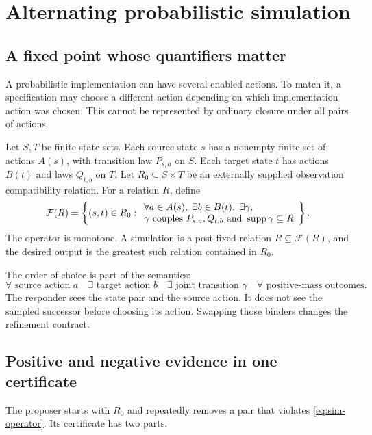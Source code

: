 \section{Alternating probabilistic simulation}
\label{sec:simulation}

\subsection{A fixed point whose quantifiers matter}

A probabilistic implementation can have several enabled actions. To match it,
a specification may choose a different action depending on which
implementation action was chosen. This cannot be represented by ordinary
closure under all pairs of actions.

Let $S,T$ be finite state sets. Each source state $s$ has a nonempty finite
set of actions $A(s)$, with transition law $P_{s,a}$ on $S$. Each target state
$t$ has actions $B(t)$ and laws $Q_{t,b}$ on $T$. Let $R_0\subseteq S\times T$
be an externally supplied observation compatibility relation. For a relation
$R$, define
\begin{equation}
 \mathcal F(R)=\left\{(s,t)\in R_0:
 \begin{array}{l}
 \forall a\in A(s),\ \exists b\in B(t),\ \exists\gamma,\\
 \gamma\text{ couples }P_{s,a},Q_{t,b}
       \text{ and }\operatorname{supp}\gamma\subseteq R
 \end{array}\right\}.
 \label{eq:sim-operator}
\end{equation}
The operator is monotone. A simulation is a post-fixed relation
$R\subseteq\mathcal F(R)$, and the desired output is the greatest such
relation contained in $R_0$.

The order of choice is part of the semantics:
\[
 \forall\text{ source action }a\quad
 \exists\text{ target action }b\quad
 \exists\text{ joint transition }\gamma\quad
 \forall\text{ positive-mass outcomes}.
\]
The responder sees the state pair and the source action. It does not see the
sampled successor before choosing its action. Swapping those binders changes
the refinement contract.

\subsection{Positive and negative evidence in one certificate}

The proposer starts with $R_0$ and repeatedly removes a pair that violates
\eqref{eq:sim-operator}. Its certificate has two parts.

